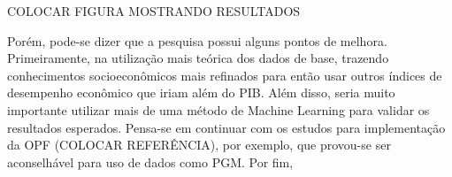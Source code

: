 \documentclass[]{article}
\begin{document}
COLOCAR FIGURA MOSTRANDO RESULTADOS

Porém, pode-se dizer que a pesquisa possui alguns pontos de melhora. Primeiramente, na utilização mais teórica dos dados de base, trazendo conhecimentos socioeconômicos mais refinados para então usar outros índices de desempenho econômico que iriam além do PIB.
Além disso, seria muito importante utilizar mais de uma método de Machine Learning para validar os resultados esperados. Pensa-se em continuar com os estudos para implementação da OPF (COLOCAR REFERÊNCIA), por exemplo, que provou-se ser aconselhável para uso de dados como PGM.
Por fim, 








\end{document}
